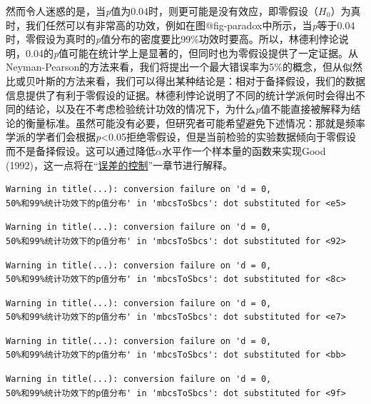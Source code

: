 \documentclass[
  letterpaper,
  DIV=11,
  numbers=noendperiod]{scrreprt}
\begin{document}
然而令人迷惑的是，当\emph{p}值为0.04时，则更可能是没有效应，即零假设（\(H_0\)）为真时，我们任然可以有非常高的功效，例如在图@fig-paradox中所示，当\emph{p}等于0.04时，零假设为真时的\emph{p}值分布的密度要比99\%功效时要高。所以，林德利悖论说明，0.04的\emph{p}值可能在统计学上是显著的，但同时也为零假设提供了一定证据。从Neyman-Pearson的方法来看，我们将提出一个最大错误率为5\%的概念，但从似然比或贝叶斯的方法来看，我们可以得出某种结论是：相对于备择假设，我们的数据信息提供了有利于零假设的证据。林德利悖论说明了不同的统计学派何时会得出不同的结论，以及在不考虑检验统计功效的情况下，为什么\emph{p}值不能直接被解释为结论的衡量标准。虽然可能没有必要，但研究者可能希望避免下述情况：那就是频率学派的学者们会根据\emph{p}\textless0.05拒绝零假设，但是当前检验的实验数据倾向于零假设而不是备择假设。这可以通过降低\(\alpha\)水平作一个样本量的函数来实现Good
(1992)，这一点将在``\protect\hyperlink{errorcontrol}{误差的控制}''一章节进行解释。

\begin{verbatim}
Warning in title(...): conversion failure on 'd = 0,
50%和99%统计功效下的p值分布' in 'mbcsToSbcs': dot substituted for <e5>
\end{verbatim}

\begin{verbatim}
Warning in title(...): conversion failure on 'd = 0,
50%和99%统计功效下的p值分布' in 'mbcsToSbcs': dot substituted for <92>
\end{verbatim}

\begin{verbatim}
Warning in title(...): conversion failure on 'd = 0,
50%和99%统计功效下的p值分布' in 'mbcsToSbcs': dot substituted for <8c>
\end{verbatim}

\begin{verbatim}
Warning in title(...): conversion failure on 'd = 0,
50%和99%统计功效下的p值分布' in 'mbcsToSbcs': dot substituted for <e7>
\end{verbatim}

\begin{verbatim}
Warning in title(...): conversion failure on 'd = 0,
50%和99%统计功效下的p值分布' in 'mbcsToSbcs': dot substituted for <bb>
\end{verbatim}

\begin{verbatim}
Warning in title(...): conversion failure on 'd = 0,
50%和99%统计功效下的p值分布' in 'mbcsToSbcs': dot substituted for <9f>
\end{verbatim}
\end{document}
